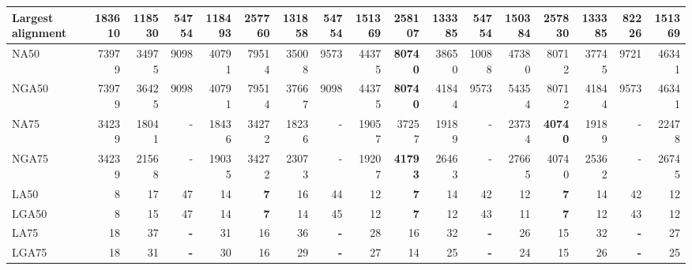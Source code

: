 \documentclass[12pt,a4paper]{article}
\begin{document}
\begin{table}[ht]
\begin{center}
\begin{tabular}{|l*{16}{|r}|}
Largest alignment & 183610 & 118530 & 54754 & 118493 & 257760 & 131858 & 54754 & 151369 & {\bf 258107} & 133385 & 54754 & 150384 & 257830 & 133385 & 82226 & 151369 \\ \hline
NA50 & 73979 & 34975 & 9098 & 40791 & 79514 & 35008 & 9573 & 44375 & {\bf 80740} & 38650 & 10088 & 47380 & 80712 & 37745 & 9721 & 46341 \\ \hline
NGA50 & 73979 & 36425 & 9098 & 40791 & 79514 & 37667 & 9098 & 44375 & {\bf 80740} & 41844 & 9573 & 54354 & 80712 & 41844 & 9573 & 46341 \\ \hline
NA75 & 34239 & 18041 & - & 18436 & 34272 & 18236 & - & 19057 & 37257 & 19189 & - & 23734 & {\bf 40740} & 19189 & - & 22478 \\ \hline
NGA75 & 34239 & 21568 & - & 19035 & 34272 & 23073 & - & 19207 & {\bf 41793} & 26463 & - & 27665 & 40740 & 25362 & - & 26745 \\ \hline
LA50 & 8 & 17 & 47 & 14 & {\bf 7} & 16 & 44 & 12 & {\bf 7} & 14 & 42 & 12 & {\bf 7} & 14 & 42 & 12 \\ \hline
LGA50 & 8 & 15 & 47 & 14 & {\bf 7} & 14 & 45 & 12 & {\bf 7} & 12 & 43 & 11 & {\bf 7} & 12 & 43 & 12 \\ \hline
LA75 & 18 & 37 & {\bf -} & 31 & 16 & 36 & {\bf -} & 28 & 16 & 32 & {\bf -} & 26 & 15 & 32 & {\bf -} & 27 \\ \hline
LGA75 & 18 & 31 & {\bf -} & 30 & 16 & 29 & {\bf -} & 27 & 14 & 25 & {\bf -} & 24 & 15 & 26 & {\bf -} & 25 \\ \hline
\end{tabular}
\end{center}
\end{table}
\end{document}
